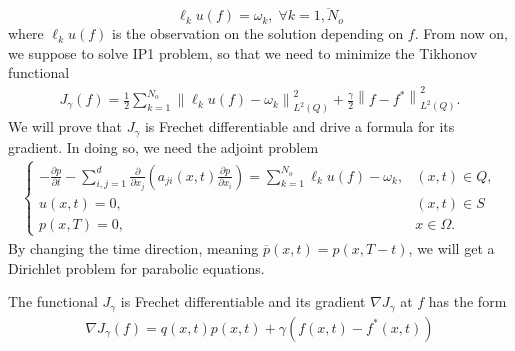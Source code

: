 \documentclass[]{article}
\begin{document}
$$\ell_k u(f)=\omega_k,\; \forall k = \overline{1, N_o}$$
where $\ell_k u(f)$ is the observation on the solution depending on $f$. From now on, \color{red} we suppose to solve IP1 problem, \color{black} so that we need to minimize the Tikhonov functional
\begin{align}\label{2.4}
	J_{\gamma}(f)=\frac{1}{2}\sum_{k=1}^{N_o}\left\|\ell_k u(f)-\omega_k\right\|_{L^2(Q)}^2+\frac{\gamma}{2}\left\|f-f^*\right\|_{L^2(Q)}^2.
\end{align}
We will prove that $J_\gamma$ is Frechet differentiable and drive a formula for its gradient. In doing so, we need the adjoint problem
\begin{align}\label{2.5}
	\begin{cases}
		-\frac{\partial p}{\partial t}-\sum_{i, j=1}^{d}\frac{\partial}{\partial x_j}\left(a_{ji}(x, t)\frac{\partial p}{\partial x_i}\right)=\sum_{k=1}^{N_o}\ell_k u(f)-\omega_k, & (x, t)\in Q,\\
		u(x, t)=0, & (x, t)\in S\\
		p(x, T)=0, & x\in \Omega.
	\end{cases}
\end{align}
By changing the time direction, meaning $\overline{p}(x, t)=p(x, T-t)$, we will get a Dirichlet problem for parabolic equations.
\begin{dl}
	The functional $J_\gamma$ is Frechet differentiable and its gradient $\nabla J_\gamma$ at $f$ has the form 
	\begin{align}\label{2.6}
		\nabla J_\gamma(f)=q(x, t)p(x, t)+\gamma \left(f(x, t)-f^*(x, t)\right)
	\end{align}
\end{dl}
\end{document}
